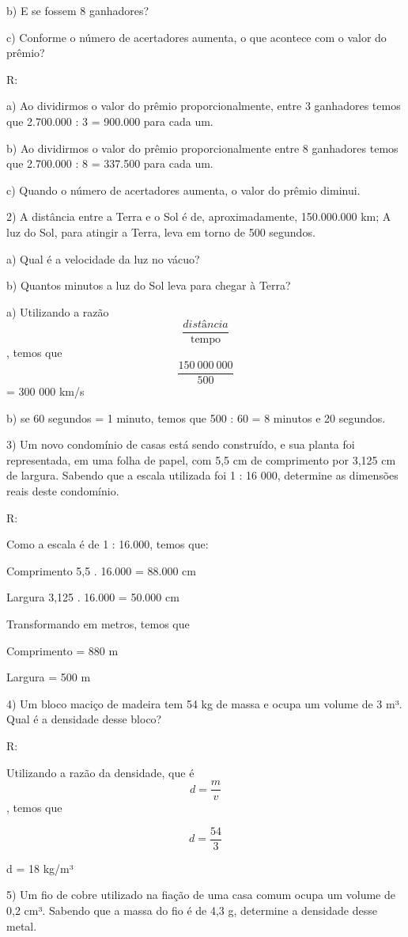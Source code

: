 b) E se fossem 8 ganhadores?

c) Conforme o número de acertadores aumenta, o que acontece com o valor
do prêmio?

R:

a) Ao dividirmos o valor do prêmio proporcionalmente, entre 3 ganhadores
temos que 2.700.000 : 3 = 900.000 para cada um.

b) Ao dividirmos o valor do prêmio proporcionalmente entre 8 ganhadores
temos que 2.700.000 : 8 = 337.500 para cada um.

c) Quando o número de acertadores aumenta, o valor do prêmio diminui.

2) A distância entre a Terra e o Sol é de, aproximadamente, 150.000.000
km; A luz do Sol, para atingir a Terra, leva em torno de 500 segundos.

a) Qual é a velocidade da luz no vácuo?

b) Quantos minutos a luz do Sol leva para chegar à Terra?

a) Utilizando a razão \[\frac{distância}{\text{tempo}}\], temos que
\[\frac{150\ 000\ 000}{500}\] = 300 000 km/s

b) se 60 segundos = 1 minuto, temos que 500 : 60 = 8 minutos e 20
segundos.

3) Um novo condomínio de casas está sendo construído, e sua planta foi
representada, em uma folha de papel, com 5,5 cm de comprimento por 3,125
cm de largura. Sabendo que a escala utilizada foi 1 : 16 000, determine
as dimensões reais deste condomínio.

R:

Como a escala é de 1 : 16.000, temos que:

Comprimento 5,5 . 16.000 = 88.000 cm

Largura 3,125 . 16.000 = 50.000 cm

Transformando em metros, temos que

Comprimento = 880 m

Largura = 500 m

4) Um bloco maciço de madeira tem 54 kg de massa e ocupa um volume de 3
m³. Qual é a densidade desse bloco?

R:

Utilizando a razão da densidade, que é \[d = \frac{m}{v}\], temos que

\[d = \frac{54}{3}\]

d = 18 kg/m³

5) Um fio de cobre utilizado na fiação de uma casa comum ocupa um volume
de 0,2 cm³. Sabendo que a massa do fio é de 4,3 g, determine a densidade
desse metal.

